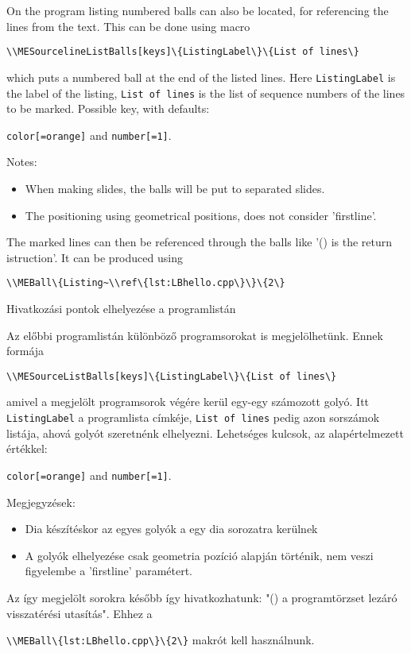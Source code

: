
{
On the program listing numbered balls can also be located, for referencing the 
lines from the text. This can be done using macro
\par\noindent\lstinline|\\MESourcelineListBalls[keys]\{ListingLabel\}\{List of lines\}|
\par\noindent which puts a numbered ball at the end of the listed lines.
Here \lstinline|ListingLabel| is the label of the listing, \lstinline|List of lines|
is the list of sequence numbers of the lines to be marked.
Possible key, with defaults:
\par\noindent\lstinline|color[=orange]| and \lstinline|number[=1]|. 


Notes:
\begin{itemize}
\item When making slides, the balls will be put to separated slides.
\item The positioning using geometrical positions, does not consider 'firstline'.
\end{itemize}

The marked lines can then be referenced through the balls like '()
is the return istruction'. It can be produced using 
\par\noindent\lstinline|\\MEBall\{Listing~\\ref\{lst:LBhello.cpp\}\}\{2\}|
}
{Hivatkozási pontok elhelyezése a programlistán}
{
Az előbbi programlistán különböző programsorokat is megjelölhetünk.
Ennek formája 
\par\noindent\lstinline|\\MESourceListBalls[keys]\{ListingLabel\}\{List of lines\}|
\par\noindent amivel a megjelölt programsorok végére kerül egy-egy számozott golyó.
Itt \lstinline|ListingLabel| a programlista címkéje, \lstinline|List of lines|
pedig azon sorszámok listája, ahová golyót szeretnénk elhelyezni.
Lehetséges kulcsok, az alapértelmezett értékkel:
\par\noindent\lstinline|color[=orange]| and \lstinline|number[=1]|. 


Megjegyzések:
\begin{itemize}
\item Dia készítéskor az egyes golyók a egy dia sorozatra kerülnek
\item A golyók elhelyezése csak geometria pozíció alapján történik, nem veszi figyelembe
a 'firstline' paramétert.
\end{itemize}


Az így megjelölt sorokra később így hivatkozhatunk: "()
a programtörzset lezáró visszatérési utasítás".
Ehhez a 
\par\noindent\lstinline|\\MEBall\{lst:LBhello.cpp\}\{2\}| makrót kell használnunk.

}

